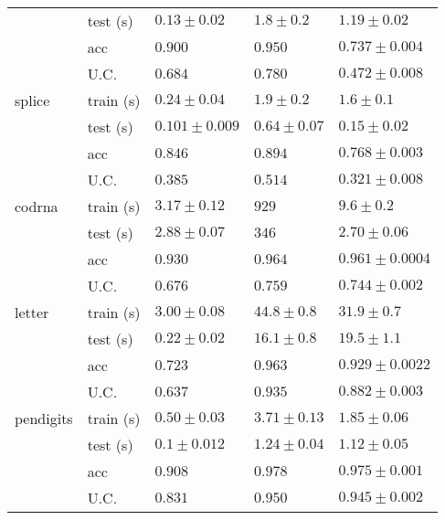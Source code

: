 \begin{tabular}{|ll|lll|}
 & test (s)       & $\mathbf{       0.13\pm     0.02}$ & $        1.8\pm     0.2$ & $        1.19\pm    0.02$\\
 & acc       & $         0.900$ & $\mathbf{        0.950}$ & $       0.737\pm   0.004$\\
 & U.C.      & $0.684$ & $\mathbf{0.780}$ & $       0.472\pm   0.008$\\
\hline
splice & train (s) & $\mathbf{       0.24\pm    0.04}$ & $        1.9\pm     0.2$ & $        1.6\pm      0.1$\\
       & test (s)       & $\mathbf{0.101\pm   0.009}$ & $       0.64\pm    0.07$ & $0.15\pm    0.02$\\
 & acc       & $       0.846$ & $\mathbf{       0.894}$ & $       0.768\pm   0.003$\\
 & U.C.      & $0.385$ & $\mathbf{0.514}$ & $       0.321\pm   0.008$\\
\hline
codrna & train (s) & $\mathbf{        3.17\pm0.12}$ & $         929$ & $        9.6\pm     0.2$\\
 & test (s)       & $        2.88\pm0.07$ & $         346$ & $\mathbf{         2.70\pm    0.06}$\\
 & acc       & $        0.930$ & $\mathbf{       0.964}$ & $       0.961\pm  0.0004$\\
 & U.C.      & $0.676$ & $\mathbf{0.759}$ & $       0.744\pm   0.002$\\
\hline
letter & train (s) & $\mathbf{        3.00\pm0.08}$ & $        44.8\pm     0.8$ & $        31.9\pm     0.7$\\
 & test (s)       & $\mathbf{       0.22\pm    0.02}$ & $        16.1\pm     0.8$ & $        19.5\pm      1.1$\\
 & acc       & $       0.723$ & $\mathbf{       0.963}$ & $       0.929\pm   0.0022$\\
 & U.C.      & $0.637$ & $\mathbf{0.935}$ & $       0.882\pm   0.003$\\
\hline
pendigits & train (s) & $\mathbf{       0.50\pm    0.03}$ & $        3.71\pm     0.13$ & $        1.85\pm    0.06$\\
 & test (s)       & $\mathbf{         0.1\pm    0.012}$ & $        1.24\pm    0.04$ & $        1.12\pm    0.05$\\
 & acc       & $       0.908$ & $\mathbf{       0.978}$ & $       0.975\pm   0.001$\\
 & U.C.      & $0.831$ & $\mathbf{0.950}$ & $       0.945\pm   0.002$\\
\hline
\end{tabular}
